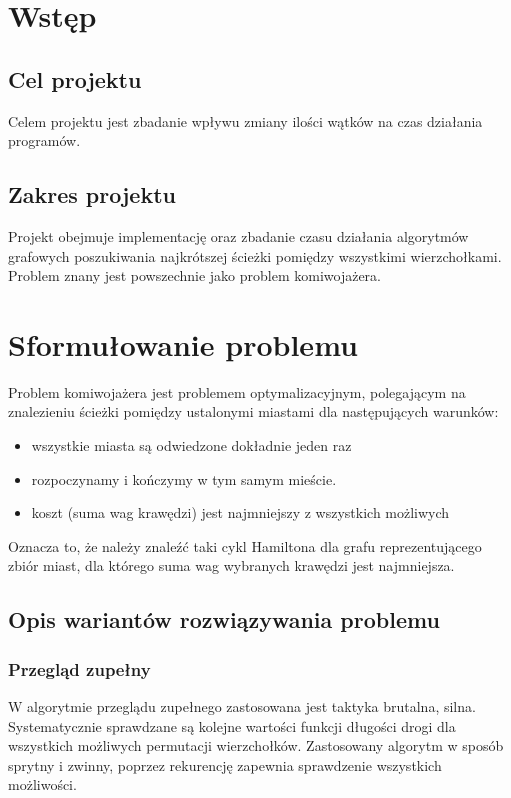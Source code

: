 \documentclass{article}
\begin{document}
	

\tableofcontents

\newpage
	
\listoffigures
\newpage

\listoftables	
\newpage

	
	
\section{Wstęp}
	\subsection{Cel projektu}
		Celem projektu jest zbadanie wpływu zmiany ilości wątków na czas działania programów.
	\subsection {Zakres projektu}
	Projekt obejmuje implementację oraz zbadanie czasu działania algorytmów grafowych poszukiwania najkrótszej ścieżki pomiędzy wszystkimi wierzchołkami. Problem znany jest powszechnie jako problem komiwojażera.
\section{Sformułowanie problemu}
		Problem komiwojażera jest problemem optymalizacyjnym, polegającym na znalezieniu ścieżki pomiędzy ustalonymi miastami dla następujących warunków: 
		\begin{itemize}
			\item wszystkie miasta są odwiedzone dokładnie jeden raz
			\item rozpoczynamy i kończymy w tym samym mieście.
			\item koszt (suma wag krawędzi) jest najmniejszy z wszystkich możliwych
		\end{itemize}
		Oznacza to, że należy znaleźć taki cykl Hamiltona dla grafu reprezentującego zbiór miast, dla którego suma wag wybranych krawędzi jest najmniejsza.
		
	\subsection{Opis wariantów rozwiązywania problemu}	
		\subsubsection{Przegląd zupełny}
				W algorytmie przeglądu zupełnego zastosowana jest taktyka brutalna, silna. Systematycznie sprawdzane są kolejne wartości funkcji długości drogi dla wszystkich możliwych permutacji wierzchołków. Zastosowany algorytm w sposób sprytny i zwinny, poprzez rekurencję zapewnia sprawdzenie wszystkich możliwości.
\end{document}
